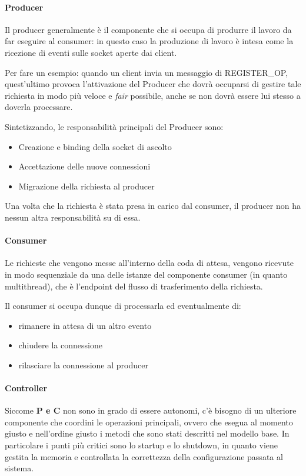 \documentclass[]{article}
\begin{document}
\paragraph{Producer}
Il producer generalmente \`e il componente che si occupa di produrre il lavoro da far eseguire al
consumer: in questo caso la produzione di lavoro \`e intesa come la ricezione di eventi sulle socket
aperte dai client.

Per fare un esempio: quando un client invia un messaggio di REGISTER\_OP, quest'ultimo provoca
l'attivazione del Producer che dovr\`a occuparsi di gestire tale richiesta in modo pi\`u
veloce e \textit{fair} possibile, anche se non dovr\`a essere lui stesso a doverla
processare.

Sintetizzando, le responsabilit\`a principali del Producer sono:
\begin{itemize}
	\item Creazione e binding della socket di ascolto
	\item Accettazione delle nuove connessioni
	\item Migrazione della richiesta al producer
\end{itemize}

Una volta che la richiesta \`e stata presa in carico dal consumer,
il producer non ha nessun altra responsabilit\`a su di essa.

\paragraph{Consumer}
Le richieste che vengono messe all'interno della coda di attesa, vengono
ricevute in modo sequenziale da una delle istanze del componente consumer
(in quanto multithread), che \`e l'endpoint del flusso di trasferimento della richiesta.

Il consumer si occupa dunque di processarla ed eventualmente di:
\begin{itemize}
	\item rimanere in attesa di un altro evento
	\item chiudere la connessione
	\item rilasciare la connessione al producer
\end{itemize}

\paragraph{Controller}
Siccome \textbf{P e C} non sono in grado di essere
autonomi, c'\`e bisogno di un ulteriore componente che coordini
le operazioni principali, ovvero che esegua al momento giusto
e nell'ordine giusto i metodi che sono stati descritti
nel modello base. In particolare i punti pi\`u critici sono lo startup e lo 
shutdown, in quanto viene gestita la memoria e controllata
la correttezza della configurazione passata al sistema.
 
\end{document}
